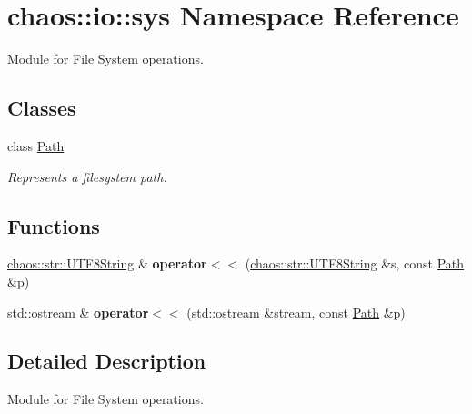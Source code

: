\hypertarget{namespacechaos_1_1io_1_1sys}{}\section{chaos\+:\+:io\+:\+:sys Namespace Reference}
\label{namespacechaos_1_1io_1_1sys}


Module for File System operations.  


\subsection*{Classes}
\begin{DoxyCompactItemize}
\item 
class \hyperlink{classchaos_1_1io_1_1sys_1_1_path}{Path}
\begin{DoxyCompactList}\small\item\em Represents a filesystem path. \end{DoxyCompactList}\end{DoxyCompactItemize}
\subsection*{Functions}
\begin{DoxyCompactItemize}
\item 
\hypertarget{namespacechaos_1_1io_1_1sys_a7ad24cad9d101351dcf374a9594c776a}{}\hyperlink{classchaos_1_1str_1_1_u_t_f8_string}{chaos\+::str\+::\+U\+T\+F8\+String} \& {\bfseries operator$<$$<$} (\hyperlink{classchaos_1_1str_1_1_u_t_f8_string}{chaos\+::str\+::\+U\+T\+F8\+String} \&s, const \hyperlink{classchaos_1_1io_1_1sys_1_1_path}{Path} \&p)\label{namespacechaos_1_1io_1_1sys_a7ad24cad9d101351dcf374a9594c776a}

\item 
\hypertarget{namespacechaos_1_1io_1_1sys_aa28fa69e8966c0ff55c3b59cdff9cebc}{}std\+::ostream \& {\bfseries operator$<$$<$} (std\+::ostream \&stream, const \hyperlink{classchaos_1_1io_1_1sys_1_1_path}{Path} \&p)\label{namespacechaos_1_1io_1_1sys_aa28fa69e8966c0ff55c3b59cdff9cebc}

\end{DoxyCompactItemize}


\subsection{Detailed Description}
Module for File System operations. 